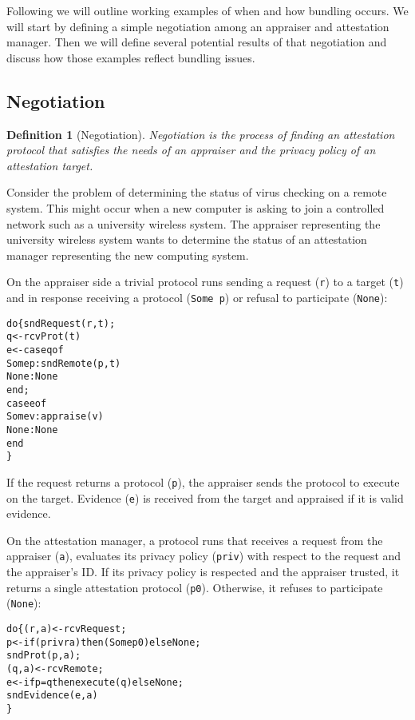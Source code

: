 \documentclass[10pt]{article}
\newtheorem{definition}{Definition}
\begin{document}
Following we will outline working examples of when and how bundling
occurs.  We will start by defining a simple negotiation among an
appraiser and attestation manager.  Then we will define several
potential results of that negotiation and discuss how those examples
reflect bundling issues.

\subsection*{Negotiation}

\begin{definition}[Negotiation]
  Negotiation is the process of finding an attestation protocol that
  satisfies the needs of an appraiser and the privacy policy of an
  attestation target.
\end{definition}

Consider the problem of determining the status of virus checking on a
remote system.  This might occur when a new computer is asking to join
a controlled network such as a university wireless system.  The
appraiser representing the university wireless system wants to
determine the status of an attestation manager representing the new
computing system.

On the appraiser side a trivial protocol runs sending a request
(\Verb+r+) to a target (\Verb+t+) and in response receiving a protocol
(\Verb+Some p+) or refusal to participate (\Verb+None+):

\begin{alltt}
  do \{ sndRequest(r,t);
       q <- rcvProt(t)
       e <- case q of
              Some p : sndRemote(p,t)
              None : None
            end;
       case e of 
         Some v : appraise(v)
         None : None
       end
  \}
\end{alltt}

If the request returns a protocol (\Verb+p+), the appraiser sends the
protocol to execute on the target. Evidence (\Verb+e+) is received
from the target and appraised if it is valid evidence.

On the attestation manager, a protocol runs that receives a request
from the appraiser (\Verb+a+), evaluates its privacy policy
(\Verb+priv+) with respect to the request and the appraiser's ID.  If
its privacy policy is respected and the appraiser trusted, it returns
a single attestation protocol (\Verb+p0+).  Otherwise, it refuses to
participate (\Verb+None+):

\begin{alltt}
  do \{ (r,a) <- rcvRequest;
       p <- if (priv r a) then (Some p0) else None;
       sndProt(p,a);
       (q,a) <- rcvRemote;
       e <- if p=q then execute(q) else None;
       sndEvidence(e,a)
  \}
\end{alltt}
\end{document}
